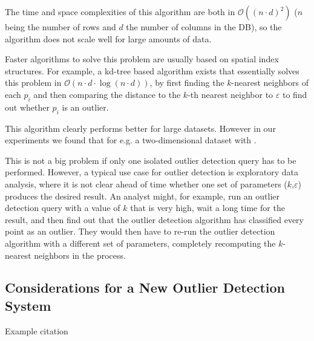 \documentclass[runningheads]{llncs}
\begin{document}
The time and space complexities of this algorithm are both in $\mathcal{O}((n\cdot d)^2)$ ($n$ being the number of rows and $d$ the number of columns in the DB), so the algorithm does not scale well for large amounts of data.

Faster algorithms to solve this problem are usually based on spatial index structures. For example, a kd-tree based algorithm exists that essentially solves this problem in $\mathcal{O}(n\cdot d \cdot\log(n\cdot d))$, by first finding the $k$-nearest neighbors of each $p_i$ and then comparing the distance to the $k$-th nearest neighbor to $\varepsilon$ to find out whether $p_i$ is an outlier. 

This algorithm clearly performs better for large datasets. However in our experiments we found that for e.g. a two-dimensional dataset with . %

This is not a big problem if only one isolated outlier detection query has to be performed. However, a typical use case for outlier detection is exploratory data analysis, where it is not clear ahead of time whether one set of parameters ($k$,$\varepsilon$) produces the desired result. An analyst might, for example, run an outlier detection query with a value of $k$ that is very high, wait a long time for the result, and then find out that the outlier detection algorithm has classified every point as an outlier. They would then have to re-run the outlier detection algorithm with a different set of parameters, completely recomputing the $k$-nearest neighbors in the process.
\subsection{Considerations for a New Outlier Detection System}


Example citation \cite{DBLP:conf/civr/BeecksUS10}

%
%


  
\end{document}
